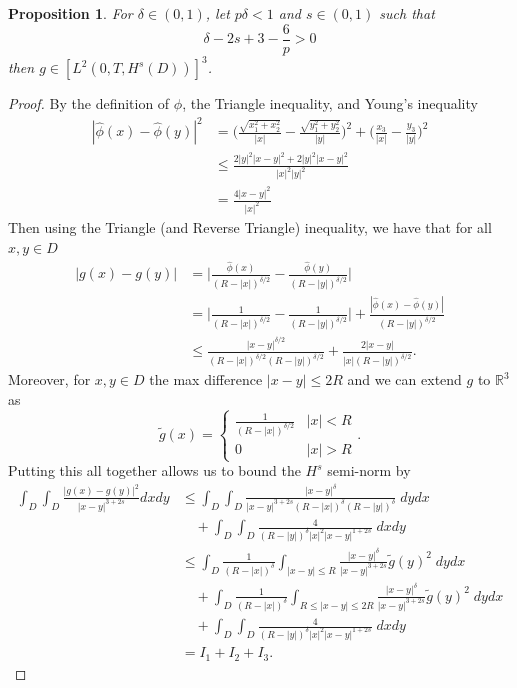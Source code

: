 \documentclass[11pt, reqno]{article}
\def\R{{\mathbb R}} %
\newtheorem{proposition}[theorem]{Proposition}
\def\ds{\displaystyle}
\begin{document}
\begin{proposition}
    For $\delta \in (0,1)$, let $p\delta < 1$ and $s \in (0,1)$ such that 
    \begin{equation}\label{ineq: positive exponent}
         \delta - 2s + 3 - \frac{6}{p} > 0
    \end{equation}
    then $g \in [L^2(0,T, H^s(D))]^3$. 
\end{proposition}
\begin{proof}
    By the definition of $\widehat{\phi}$, the Triangle inequality, and Young's inequality
    \begin{align*}
        |\widehat{\phi}(x) - \widehat{\phi}(y)|^2 &= \Big(\frac{\sqrt{x_1^2 + x_2^2}}{|x|} - \frac{\sqrt{y_1^2 + y_2^2}}{|y|}\Big)^2 + \Big(\frac{x_3}{|x|} - \frac{y_3}{|y|}\Big)^2\\
        &\leq \frac{2|y|^2|x-y|^2 + 2|y|^2|x-y|^2}{|x|^2|y|^2}\\
        &= \frac{4|x-y|^2}{|x|^2}
    \end{align*}
    Then using the Triangle (and Reverse Triangle) inequality, we have that for all $x, y \in D$
    \begin{align*}
        |g(x) - g(y)| &= \Big|\frac{\widehat{\phi}(x)}{(R-|x|)^{\delta/2}} - \frac{\widehat{\phi}(y)}{(R-|y|)^{\delta/2}}\Big|\\
        &= \Big|\frac{1}{(R-|x|)^{\delta/2}} - \frac{1}{(R-|y|)^{\delta/2}}\Big| + \frac{|\widehat{\phi}(x) - \widehat{\phi}(y)|}{(R-|y|)^{\delta/2}}\\
        &\leq \frac{|x-y|^{\delta/2}}{(R-|x|)^{\delta/2}(R-|y|)^{\delta/2}} + \frac{2|x-y|}{|x|(R-|y|)^{\delta/2}}.
    \end{align*}
    Moreover, for $x,y \in D$ the max difference $|x-y| \leq 2R$ and we can extend $g$ to $\R^3$ as 
    \[
        \ds\tilde{g}(x) = \begin{cases}
            \frac{1}{(R-|x|)^{\delta/2}} & |x| < R\\
             0 & |x| > R
        \end{cases}.
    \]
    Putting this all together allows us to bound the $H^s$ semi-norm by
    \begin{align*}
        \int_D \int_D \frac{|g(x) - g(y)|^2}{|x-y|^{3+2s}}dxdy &\leq \int_D\int_D \frac{|x-y|^\delta}{|x-y|^{3+2s}(R-|x|)^{\delta}(R-|y|)^\delta}\;dydx \\
        &\quad + \int_D\int_D \frac{4}{(R-|y|)^\delta |x|^2|x-y|^{1+2s}}\;dxdy\\
        &\leq  \int_D \frac{1}{(R - |x|)^\delta}\int_{|x-y| \leq R}  \frac{|x-y|^\delta}{|x-y|^{3+2s}}\tilde{g}(y)^2\;dydx\\
        &\quad +  \int_D \frac{1}{(R - |x|)^\delta}\int_{R \leq |x-y| \leq 2R}  \frac{|x-y|^\delta}{|x-y|^{3+2s}}\tilde{g}(y)^2\;dydx\\
        &\quad + \int_D\int_D \frac{4}{(R-|y|)^\delta |x|^2|x-y|^{1+2s}}\;dxdy\\
        &= I_1 + I_2 + I_3.
    \end{align*}
    

\end{proof}
\end{document}
